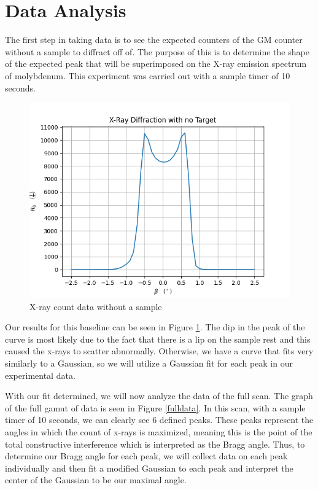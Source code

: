 \documentclass[twocolumn]{article}
\begin{document}
	\section{Data Analysis}
			The first step in taking data is to see the expected counters of the GM counter without a sample to diffract off of. The purpose of this is to determine the shape of the expected peak that will be superimposed on the X-ray emission spectrum of molybdenum. This experiment was carried out with a sample timer of 10 seconds.
			\begin{figure}
				\centering
				\includegraphics[width = .5\textwidth]{../Graphs/ZeroData}
				\caption{X-ray count data without a sample}
				\label{zerodata}
			\end{figure}
			Our results for this baseline can be seen in Figure \ref{zerodata}. The dip in the peak of the curve is most likely due to the fact that there is a lip on the sample rest and this caused the x-rays to scatter abnormally. Otherwise, we have a curve that fits very similarly to a Gaussian, so we will utilize a Gaussian fit for each peak in our experimental data. 
			
			With our fit determined, we will now analyze the data of the full scan. The graph of the full gamut of data is seen in Figure \ref{fulldata}. In this scan, with a sample timer of 10 seconds, we can clearly see 6 defined peaks. These peaks represent the angles in which the count of x-rays is maximized, meaning this is the point of the total constructive interference which is interpreted as the Bragg angle. Thus, to determine our Bragg angle for each peak, we will collect data on each peak individually and then fit a modified Gaussian to each peak and interpret the center of the Gaussian to be our maximal angle.
			
\end{document}
